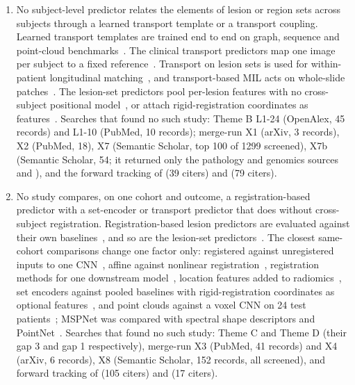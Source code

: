 \documentclass[journal,onecolumn]{IEEEtran}
\begin{document}
\begin{enumerate}

\item{} No subject-level predictor relates the elements of lesion or region sets across subjects through a learned transport template or a transport coupling. Learned transport templates are trained end to end on graph, sequence and point-cloud benchmarks~\cite{VincentCuaz2022Template,Mialon2021Trainable,Kolouri2021Wasserstein,BrogatMotte2022Learning,Mallery2025Synthesis,Bai2025Linear}. The clinical transport predictors map one image per subject to a fixed reference~\cite{Kundu2018Discovery,Kundu2020Enabling,Kundu2024Discovering,Ironside2025Predictive}. Transport on lesion sets is used for within-patient longitudinal matching~\cite{Qahqaie2026Unbalanced}, and transport-based MIL acts on whole-slide patches~\cite{Ren2025OTSurv,Xu2023Multimodal,Song2024Multimodal}. The lesion-set predictors pool per-lesion features with no cross-subject positional model~\cite{Chen2021AMINN,Wilk2025Towards,Geady2025Radiomic,Alberb2026Automated,Sabouri2025Enhancing}, or attach rigid-registration coordinates as features~\cite{Karimzadeh2026Revisiting}. Searches that found no such study: Theme B L1-24 (OpenAlex, 45 records) and L1-10 (PubMed, 10 records); merge-run X1 (arXiv, 3 records), X2 (PubMed, 18), X7 (Semantic Scholar, top 100 of 1299 screened), X7b (Semantic Scholar, 54; it returned only the pathology and genomics sources \cite{Xu2023Multimodal} and \cite{Little2023Associating}), and the forward tracking of \cite{VincentCuaz2022Template} (39 citers) and \cite{Mialon2021Trainable} (79 citers).

\item{} No study compares, on one cohort and outcome, a registration-based predictor with a set-encoder or transport predictor that does without cross-subject registration. Registration-based lesion predictors are evaluated against their own baselines~\cite{Bates2003Voxel,Bowren2022Poststroke,Brzus2026Clinical,Bonkhoff2024Prediction,Choi2026Tumor}, and so are the lesion-set predictors~\cite{Chen2021AMINN,Prabhakar2023Selfpruning,Wilk2025Towards}. The closest same-cohort comparisons change one factor only: registered against unregistered inputs to one CNN~\cite{Dong2024Self}, affine against nonlinear registration~\cite{Fujibayashi2021Nonlinear}, registration methods for one downstream model~\cite{Choi2026Tumor}, location features added to radiomics~\cite{Liu2023Coordinatized}, set encoders against pooled baselines with rigid-registration coordinates as optional features~\cite{Karimzadeh2026Revisiting}, and point clouds against a voxel CNN on 24 test patients~\cite{Liu2026Three}; MSPNet was compared with spectral shape descriptors and PointNet~\cite{GutierrezBecker2018MSPNet}. Searches that found no such study: Theme C and Theme D (their gap 3 and gap 1 respectively), merge-run X3 (PubMed, 41 records) and X4 (arXiv, 6 records), X8 (Semantic Scholar, 152 records, all screened), and forward tracking of \cite{Bowren2022Poststroke} (105 citers) and \cite{Chen2021AMINN} (17 citers).


\end{enumerate}
\end{document}
